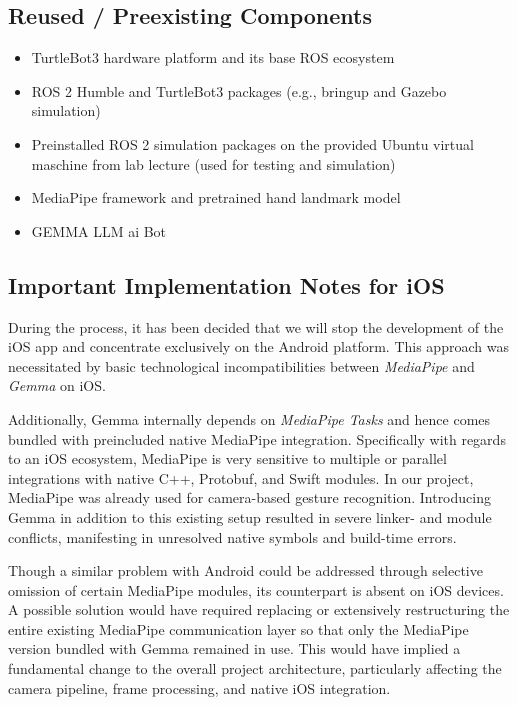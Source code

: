 \documentclass[11pt,a4paper]{article}
\begin{document}
\subsection{Reused / Preexisting Components}
\begin{itemize}[leftmargin=1.5cm]
	\item TurtleBot3 hardware platform and its base ROS ecosystem
	\item ROS 2 Humble and TurtleBot3 packages (e.g., bringup and Gazebo simulation)
	\item Preinstalled ROS 2 simulation packages on the provided Ubuntu virtual maschine from lab lecture (used for testing and simulation)
	\item MediaPipe framework and pretrained hand landmark model
	\item GEMMA LLM ai Bot
\end{itemize}


\subsection{Important Implementation Notes for iOS}

During the process, it has been decided that we will stop the development of the iOS app and
concentrate exclusively on the Android platform. This approach was necessitated by basic technological incompatibilities
between \textit{MediaPipe} and \textit{Gemma} on iOS.

Additionally, Gemma internally depends on \textit{MediaPipe Tasks} and hence comes bundled with preincluded native MediaPipe integration.
Specifically with regards to an iOS ecosystem, MediaPipe is very sensitive to multiple or parallel integrations
with native C++, Protobuf, and Swift modules. In our project, MediaPipe was already used for camera-based gesture recognition.
Introducing Gemma in addition to this existing setup resulted in severe linker- and module conflicts, manifesting in
unresolved native symbols and build-time errors.

Though a similar problem with Android could be addressed through selective omission of certain MediaPipe modules,
its counterpart is absent on iOS devices. A possible solution would have required replacing or extensively restructuring
the entire existing MediaPipe communication layer so that only the MediaPipe version bundled with Gemma remained in use.
This would have implied a fundamental change to the overall project architecture, particularly affecting the camera pipeline,
frame processing, and native iOS integration.
\end{document}
